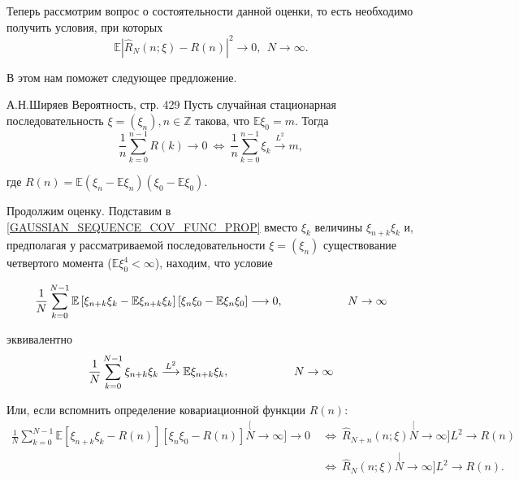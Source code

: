 		Теперь рассмотрим вопрос о состоятельности данной оценки, то есть необходимо получить условия, при которых
		\begin{equation*}
			\mathbb{E} \left| \hat{R}_N(n; \xi) - R(n)\right|^2 \longrightarrow 0, \ \  N \rightarrow \infty.
		\end{equation*}
	
		В этом нам поможет следующее предложение.
		
		\begin{Proposal}{А.Н.Ширяев Вероятность, стр. 429}
			Пусть случайная стационарная последовательность $\xi = (\xi_n), n \in \mathbb{Z}$ такова, что $\mathbb{E}\xi_0 = m$. Тогда
			\begin{equation}
				\frac{1}{n} \sum\limits_{k=0}^{n-1} R(k) \longrightarrow 0 \  \Longleftrightarrow \  \frac{1}{n}\sum\limits_{k=0}^{n-1} \xi_k \stackrel{L^2}{\longrightarrow} m,
				\label{GAUSSIAN_SEQUENCE_COV_FUNC_PROP}
			\end{equation}
		
		\noindent где $R(n) = \mathbb{E}(\xi_n - \mathbb{E}\xi_n)(\xi_0 - \mathbb{E}\xi_0)$.
		\end{Proposal}
	
		Продолжим оценку. Подставим в \eqref{GAUSSIAN_SEQUENCE_COV_FUNC_PROP} вместо $\xi_k$ величины $\xi_{n+k}\xi_k$ и, предполагая у рассматриваемой последовательности $\xi = (\xi_n)$ существование четвертого момента ($\mathbb{E}\xi_0^4 < \infty$), находим, что условие
		
		\begin{equation*}
			\frac{1}{N}\sum\limits_{k = 0}^{N-1}\mathbb{E}\left[\xi_{n+k}\xi_k - \mathbb{E}\xi_{n+k}\xi_k\right]\left[\xi_n\xi_0 - \mathbb{E}\xi_n\xi_0\right] \longrightarrow 0, \hspace{20mm} N \rightarrow \infty
		\end{equation*}
	
		\noindent эквивалентно
		\begin{equation*}
			\frac{1}{N}\sum\limits_{k=0}^{N-1}\xi_{n+k}\xi_k \stackrel{L^2}{\longrightarrow} \mathbb{E}\xi_{n+k}\xi_k, \hspace{20mm} N \rightarrow \infty
		\end{equation*}
	
		\noindent Или, если вспомнить определение ковариационной функции $R(n)$:
		\begin{equation*}
			\begin{split}
			\frac{1}{N}\sum\limits_{k=0}^{N-1}\mathbb{E}\left[\xi_{n+k}\xi_k - R(n)\right]\left[\xi_n\xi_0 - R(n)\right] \stackrel[N \rightarrow \infty]{}{\longrightarrow} 0 \  &\Longleftrightarrow \  \hat{R}_{N+n}(n; \xi) \stackrel[N \rightarrow \infty]{L^2}{\longrightarrow} R(n) \  \\
			&\Longleftrightarrow \  \hat{R}_N(n; \xi) \stackrel[N \rightarrow \infty]{L^2}{\longrightarrow} R(n).
			\end{split}
		\end{equation*}
	

